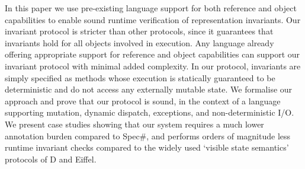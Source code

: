 In this paper we use pre-existing language support for both reference and object capabilities to enable sound runtime verification of representation invariants.
Our invariant protocol is stricter than other  protocols, since it guarantees that invariants hold for all objects involved in execution.
Any language already offering appropriate support for reference and object capabilities can support our invariant protocol with minimal added complexity.
In our protocol, invariants are simply specified as methods whose execution is statically guaranteed to be deterministic and do not access any externally mutable state.
We formalise our approach and prove that our protocol is sound, in the context of a language supporting mutation, dynamic dispatch, exceptions, and non-deterministic I/O.
We present case studies showing that our system requires a much lower annotation burden compared to Spec\#, and performs orders of magnitude less runtime invariant checks compared to the widely used `visible state semantics' protocols of D and Eiffel.
